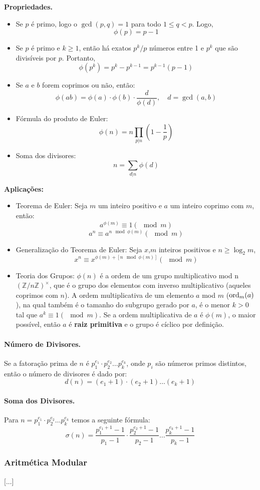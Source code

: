 \textbf{Propriedades.}
\begin{multicols}{2}
    \begin{itemize}
        \item Se $p$ é primo, logo o $\gcd(p,q) = 1$ para todo $1\leq q < p$. Logo,
        $$\phi(p) = p-1$$
        \item Se $p$ é primo e $k \ge 1$, então há exatos $p^k/p$ números entre 1 e $p^k$ que são divisíveis por $p$. Portanto,
        $$\phi(p^k) = p^k - p^{k-1} = p^{k-1}(p-1)$$
        \item Se $a$ e $b$ forem coprimos ou não, então:
        $$\phi(ab)=\phi(a)\cdot \phi(b) \cdot \frac{d}{\phi(d)},\quad d = \gcd(a,b)$$
        \item Fórmula do produto de Euler:
        $$\phi(n)=n\prod_{p|n}(1-\frac{1}{p})$$
        \item Soma dos divisores:
        $$n = \sum_{d|n}\phi(d)$$
    \end{itemize}
    
\end{multicols}

\textbf{Aplicações:}
\begin{itemize}
    \item Teorema de Euler: Seja $m$ um inteiro positivo e $a$ um inteiro coprimo com $m$, então:
    $$a^{\phi(m)} \equiv 1 (\mod m)$$
    $$a^n \equiv a^{n \mod \phi(m)} (\mod m)$$
    
    \item Generalização do Teorema de Euler: Seja $x$,$m$ inteiros positivos e $n \ge \log_2m$,
    $$x^n \equiv x^{\phi(m)+[n \mod \phi(m)]}(\mod m)$$
    
    \item Teoria dos Grupos: $\phi(n)$ é a ordem de um grupo multiplicativo mod n $(\mathbb{Z}/n\mathbb{Z})^{\times}$, que é o grupo dos elementos com inverso multiplicativo (aqueles coprimos com $n$). A ordem multiplicativa de um elemento $a$ mod $m$ ($\textnormal{ord}_m(a)$), na qual também é o tamanho do subgrupo gerado por $a$, é o menor $k > 0$ tal que $a^k \equiv 1 (\mod m)$. Se a ordem multiplicativa de $a$ é $\phi(m)$, o maior possível, então $a$ é \textbf{raiz primitiva} e o grupo é cíclico por definição.
    
\end{itemize}

\paragraph{Número de Divisores.} Se a fatoração prima de $n$ é $p_1^{e_1}\cdot p_2^{e_2}\dots  p_k^{e_k}$, onde $p_i$ são números primos distintos, então o número de divisores é dado por:
$$d(n) = (e_1+1)\cdot(e_2+1) \dots (e_k+1)$$

\paragraph{Soma dos Divisores.} Para $n = p_1^{e_1}\cdot p_2^{e_2}\dots p_k^{e_k}$ temos a seguinte fórmula:
$$\sigma(n) = \frac{p_1^{e_1+1}-1}{p_1-1} \cdot \frac{p_2^{e_2+1}-1}{p_2-1}  \dots  \frac{p_k^{e_k+1}-1}{p_k-1}$$

\subsubsection{Aritmética Modular}
[...]